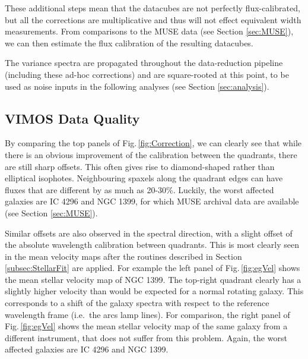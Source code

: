 		These additional steps mean that the datacubes are not perfectly flux-calibrated, but all the corrections are multiplicative and thus will not effect equivalent width measurements. From comparisons to the MUSE data (see Section \ref{sec:MUSE}), we can then estimate the flux calibration of the resulting datacubes. 

		The variance spectra are propagated throughout the data-reduction pipeline (including these ad-hoc corrections) and are square-rooted at this point, to be used as noise inputs in the following analyses (see Section \ref{sec:analysis}).

	\subsection{VIMOS Data Quality}
		\label{subsec:VIMOSartefacts}
		By comparing the top panels of Fig.\,\ref{fig:Correction}, we can clearly see that while there is an obvious improvement of the calibration between the quadrants, there are still sharp offsets. This often gives rise to diamond-shaped rather than elliptical isophotes. Neighbouring spaxels along the quadrant edges can have fluxes that are different by as much as 20-30\%. Luckily, the worst affected galaxies are IC 4296 and NGC 1399, for which MUSE archival data are available (see Section \ref{sec:MUSE}). 

		Similar offsets are also observed in the spectral direction, with a slight offset of the absolute wavelength calibration between quadrants. This is most clearly seen in the mean velocity maps after the routines described in Section \ref{subsec:StellarFit} are applied. For example the left panel of Fig.\,\ref{fig:egVel} shows the mean stellar velocity map of NGC 1399. The top-right quadrant clearly has a slightly higher velocity than would be expected for a normal rotating galaxy. This corresponds to a shift of the galaxy spectra with respect to the reference wavelength frame (i.e.\ the arcs lamp lines). For comparison, the right panel of Fig.\,\ref{fig:egVel} shows the mean stellar velocity map of the same galaxy from a different instrument, that does not suffer from this problem. Again, the worst affected galaxies are IC 4296 and NGC 1399.

